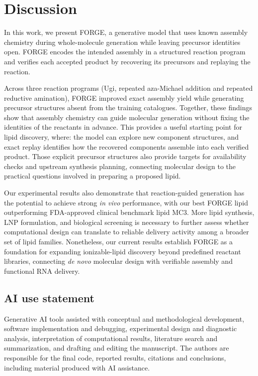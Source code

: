 \documentclass{article}
\theoremstyle{definition}
\begin{document}
\section{Discussion}

In this work, we present FORGE, a generative model that uses known assembly chemistry during whole-molecule generation while leaving precursor identities open. FORGE encodes the intended assembly in a structured reaction program and verifies each accepted product by recovering its precursors and replaying the reaction.

Across three reaction programs (Ugi, repeated aza-Michael addition and repeated reductive amination), FORGE improved exact assembly yield while generating precursor structures absent from the training catalogues. Together, these findings show that assembly chemistry can guide molecular generation without fixing the identities of the reactants in advance. This provides a useful starting point for lipid discovery, where: the model can explore new component structures, and exact replay identifies how the recovered components assemble into each verified product. Those explicit precursor structures also provide targets for availability checks and upstream synthesis planning, connecting molecular design to the practical questions involved in preparing a proposed lipid.

Our experimental results also demonstrate that reaction-guided generation has the potential to achieve strong \textit{in vivo} performance, with our best FORGE lipid outperforming FDA-approved clinical benchmark lipid MC3. More lipid synthesis, LNP formulation, and biological screening is necessary to further assess whether computational design can translate to reliable delivery activity among a broader set of lipid families. Nonetheless, our current results establish FORGE as a foundation for expanding ionizable-lipid discovery beyond predefined reactant libraries, connecting \textit{de novo} molecular design with verifiable assembly and functional RNA delivery.

\clearpage

\subsection*{AI use statement}
Generative AI tools assisted with conceptual and methodological development, software implementation
and debugging, experimental design and diagnostic analysis, interpretation of computational results,
literature search and summarization, and drafting and editing the manuscript. The authors are
responsible for the final code, reported results, citations and conclusions, including material
produced with AI assistance.
\end{document}
